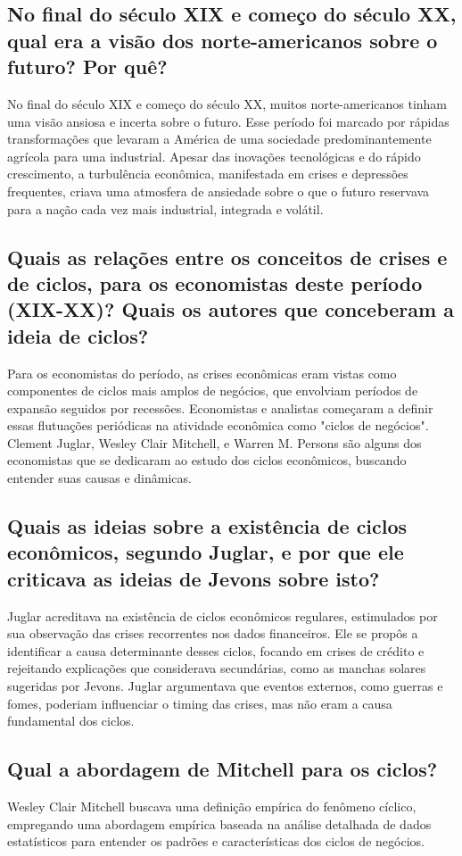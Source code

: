 \documentclass[12pt]{article}
\begin{document}
\subsection{\textbf{No final do século XIX e começo do século XX, qual era a visão dos norte-americanos sobre o futuro? Por quê?}}
No final do século XIX e começo do século XX, muitos norte-americanos tinham uma visão ansiosa e incerta sobre o futuro. Esse período foi marcado por rápidas transformações que levaram a América de uma sociedade predominantemente agrícola para uma industrial. Apesar das inovações tecnológicas e do rápido crescimento, a turbulência econômica, manifestada em crises e depressões frequentes, criava uma atmosfera de ansiedade sobre o que o futuro reservava para a nação cada vez mais industrial, integrada e volátil.
\subsection{\textbf{Quais as relações entre os conceitos de crises e de ciclos, para os economistas deste período (XIX-XX)? Quais os autores que conceberam a ideia de ciclos?}}
Para os economistas do período, as crises econômicas eram vistas como componentes de ciclos mais amplos de negócios, que envolviam períodos de expansão seguidos por recessões. Economistas e analistas começaram a definir essas flutuações periódicas na atividade econômica como "ciclos de negócios". Clement Juglar, Wesley Clair Mitchell, e Warren M. Persons são alguns dos economistas que se dedicaram ao estudo dos ciclos econômicos, buscando entender suas causas e dinâmicas.
\subsection{\textbf{Quais as ideias sobre a existência de ciclos econômicos, segundo Juglar, e por que ele criticava as ideias de Jevons sobre isto?}}
Juglar acreditava na existência de ciclos econômicos regulares, estimulados por sua observação das crises recorrentes nos dados financeiros. Ele se propôs a identificar a causa determinante desses ciclos, focando em crises de crédito e rejeitando explicações que considerava secundárias, como as manchas solares sugeridas por Jevons. Juglar argumentava que eventos externos, como guerras e fomes, poderiam influenciar o timing das crises, mas não eram a causa fundamental dos ciclos.
\subsection{\textbf{Qual a abordagem de Mitchell para os ciclos?}}
Wesley Clair Mitchell buscava uma definição empírica do fenômeno cíclico, empregando uma abordagem empírica baseada na análise detalhada de dados estatísticos para entender os padrões e características dos ciclos de negócios.
\end{document}
